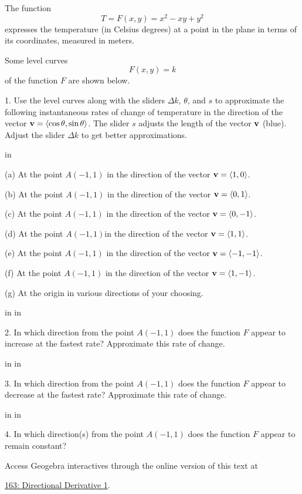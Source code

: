 \documentclass{ximera}
\newcommand{\pskip}{\vskip 0.1 in}
\begin{document}
\begin{question}  \label{Qds54546bd}

The function 
\[
     T= F(x,y) = x^2 -xy +y^2
\]
expresses the temperature (in Celsius degrees) at a point in the plane in terms of its coordinates, measured in meters.

Some level curves 
\[
     F(x,y)=k
\]
of the function $F$ are shown below. 

1. Use the level curves along with the sliders $\Delta k$, $\theta$, and $s$ to approximate the following instantaneous rates of change of temperature in the direction of the vector ${\bf v} = \langle \cos\theta, \sin\theta \rangle$. The slider $s$ adjusts the length of the vector ${\bf v}$ (blue). Adjust the slider $\Delta k$ to get better approximations.

\pskip

(a) At the point $A(-1,1)$ in the direction of the vector ${\bf v} = \langle 1, 0 \rangle$.

(b)  At the point $A(-1,1)$ in the direction of the vector ${\bf v} = \langle 0,1 \rangle$.

(c)  At the point $A(-1,1)$ in the direction of the vector ${\bf v} = \langle 0, -1 \rangle$.

(d)  At the point $A(-1,1)$in the direction of the vector ${\bf v} = \langle 1,1 \rangle$.

(e)  At the point $A(-1,1)$ in the direction of the vector ${\bf v} = \langle -1,-1 \rangle$.

(f)  At the point $A(-1,1)$ in the direction of the vector ${\bf v} = \langle 1,-1 \rangle$.

(g) At the origin in various directions of your choosing.

\pskip \pskip

2. In which direction from the point $A(-1,1)$ does the function $F$ appear to increase at the fastest rate? Approximate this rate of change.

\pskip \pskip

3. In which direction from the point $A(-1,1)$ does the function $F$ appear to decrease at the fastest rate? Approximate this rate of change.

\pskip \pskip

4. In which direction(s) from the point $A(-1,1)$ does the function $F$ appear to remain constant? 


 
\begin{onlineOnly}
    \begin{center}
\end{center}
\end{onlineOnly}

Access Geogebra interactives through the online version of this text at
 
\href{https://www.geogebra.org/classic/cfkfwfpk}{163: Directional Derivative 1}.

\end{question}
\end{document}
